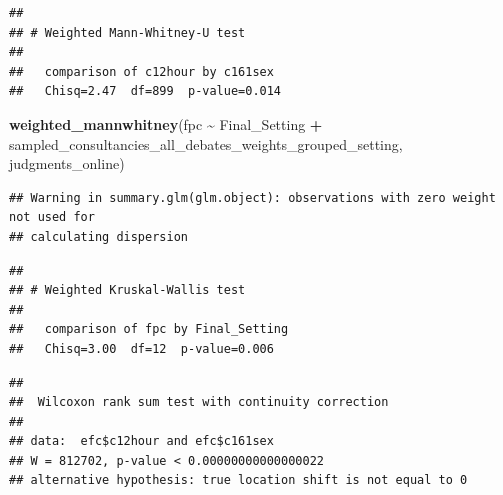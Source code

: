 \documentclass[
]{article}
\newenvironment{Shaded}{\begin{snugshade}}{\end{snugshade}}
\newcommand{\DecValTok}[1]{\textcolor[rgb]{0.00,0.00,0.81}{#1}}
\newcommand{\FunctionTok}[1]{\textcolor[rgb]{0.13,0.29,0.53}{\textbf{#1}}}
\newcommand{\NormalTok}[1]{#1}
\newcommand{\OtherTok}[1]{\textcolor[rgb]{0.56,0.35,0.01}{#1}}
\newcommand{\SpecialCharTok}[1]{\textcolor[rgb]{0.81,0.36,0.00}{\textbf{#1}}}
\begin{document}
\begin{Shaded}
\end{Shaded}

\begin{verbatim}
## 
## # Weighted Mann-Whitney-U test
## 
##   comparison of c12hour by c161sex
##   Chisq=2.47  df=899  p-value=0.014
\end{verbatim}

\begin{Shaded}
\begin{Highlighting}[]
\FunctionTok{weighted\_mannwhitney}\NormalTok{(fpc }\SpecialCharTok{\textasciitilde{}}\NormalTok{ Final\_Setting }\SpecialCharTok{+}\NormalTok{ sampled\_consultancies\_all\_debates\_weights\_grouped\_setting, judgments\_online)}
\end{Highlighting}
\end{Shaded}

\begin{verbatim}
## Warning in summary.glm(glm.object): observations with zero weight not used for
## calculating dispersion
\end{verbatim}

\begin{verbatim}
## 
## # Weighted Kruskal-Wallis test
## 
##   comparison of fpc by Final_Setting
##   Chisq=3.00  df=12  p-value=0.006
\end{verbatim}

\begin{Shaded}
\end{Shaded}

\begin{verbatim}
## 
##  Wilcoxon rank sum test with continuity correction
## 
## data:  efc$c12hour and efc$c161sex
## W = 812702, p-value < 0.00000000000000022
## alternative hypothesis: true location shift is not equal to 0
\end{verbatim}
\end{document}
